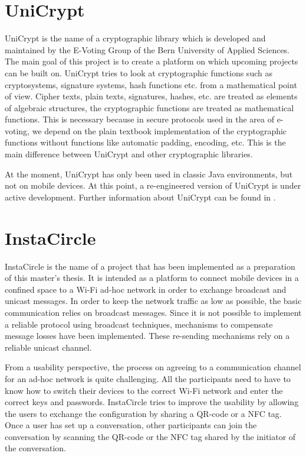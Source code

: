 \documentclass[numbers=noenddot, abstract=on, a4paper, headsepline,
footsepline, oneside, openright, draft=off, listof=leveldown]{scrreprt}
\begin{document}
\section{UniCrypt}
\label{sec:unicrypt}
UniCrypt is the name of a cryptographic library which is developed and
maintained by the E-Voting Group of the Bern University of Applied Sciences. The
main goal of this project is to create a platform on which upcoming projects can
be built on.
UniCrypt tries to look at cryptographic functions such as cryptosystems,
signature systems, hash functions etc. from a mathematical point of view. Cipher
texts, plain texts, signatures, hashes, etc. are treated as elements of
algebraic structures, the cryptographic functions are treated as mathematical functions.
This is necessary because in secure protocols used in the area
of e-voting, we depend on the plain textbook implementation of the cryptographic functions
without functions like automatic padding, encoding, etc. This is the main
difference between UniCrypt and other cryptographic libraries.

At the moment, UniCrypt has only been used in classic Java environments, but not
on mobile devices. At this point, a re-engineered version of UniCrypt is under
active development. Further information about UniCrypt can be found in \cite{ritter12}.

\section{InstaCircle}
\label{sec:instacircle}
InstaCircle is the name of a project that has been implemented as a preparation
of this master's thesis. It is intended as a platform to connect mobile devices
in a confined space to a Wi-Fi ad-hoc network in order to exchange broadcast
and unicast messages. In order to keep the network traffic as low as possible,
the basic communication relies on broadcast messages. Since it is not possible
to implement a reliable protocol using broadcast techniques, mechanisms to
compensate message losses have been implemented. These re-sending mechanisms rely
on a reliable unicast channel.

From a usability perspective, the process on agreeing to a communication channel
for an ad-hoc network is quite challenging. All the participants need to have
to know how to switch their devices to the correct Wi-Fi network and enter the
correct keys and passwords. InstaCircle tries to improve the usability by
allowing the users to exchange the configuration by sharing a QR-code or a NFC
tag. Once a user has set up a conversation, other participants can join the
conversation by scanning the QR-code or the NFC tag shared by the initiator of
the conversation.
\end{document}
